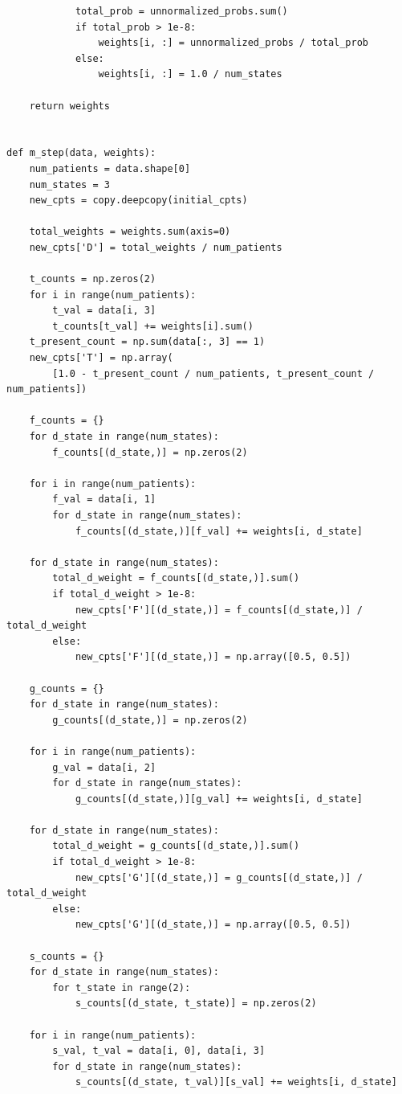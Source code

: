 \documentclass[11pt]{article}
\begin{document}
\begin{verbatim}
            total_prob = unnormalized_probs.sum()
            if total_prob > 1e-8:
                weights[i, :] = unnormalized_probs / total_prob
            else:
                weights[i, :] = 1.0 / num_states

    return weights


def m_step(data, weights):
    num_patients = data.shape[0]
    num_states = 3
    new_cpts = copy.deepcopy(initial_cpts)

    total_weights = weights.sum(axis=0)
    new_cpts['D'] = total_weights / num_patients

    t_counts = np.zeros(2)
    for i in range(num_patients):
        t_val = data[i, 3]
        t_counts[t_val] += weights[i].sum()
    t_present_count = np.sum(data[:, 3] == 1)
    new_cpts['T'] = np.array(
        [1.0 - t_present_count / num_patients, t_present_count / num_patients])

    f_counts = {}
    for d_state in range(num_states):
        f_counts[(d_state,)] = np.zeros(2)

    for i in range(num_patients):
        f_val = data[i, 1]
        for d_state in range(num_states):
            f_counts[(d_state,)][f_val] += weights[i, d_state]

    for d_state in range(num_states):
        total_d_weight = f_counts[(d_state,)].sum()
        if total_d_weight > 1e-8:
            new_cpts['F'][(d_state,)] = f_counts[(d_state,)] / total_d_weight
        else:
            new_cpts['F'][(d_state,)] = np.array([0.5, 0.5])

    g_counts = {}
    for d_state in range(num_states):
        g_counts[(d_state,)] = np.zeros(2)

    for i in range(num_patients):
        g_val = data[i, 2]
        for d_state in range(num_states):
            g_counts[(d_state,)][g_val] += weights[i, d_state]

    for d_state in range(num_states):
        total_d_weight = g_counts[(d_state,)].sum()
        if total_d_weight > 1e-8:
            new_cpts['G'][(d_state,)] = g_counts[(d_state,)] / total_d_weight
        else:
            new_cpts['G'][(d_state,)] = np.array([0.5, 0.5])

    s_counts = {}
    for d_state in range(num_states):
        for t_state in range(2):
            s_counts[(d_state, t_state)] = np.zeros(2)

    for i in range(num_patients):
        s_val, t_val = data[i, 0], data[i, 3]
        for d_state in range(num_states):
            s_counts[(d_state, t_val)][s_val] += weights[i, d_state]


\end{verbatim}
\end{document}

